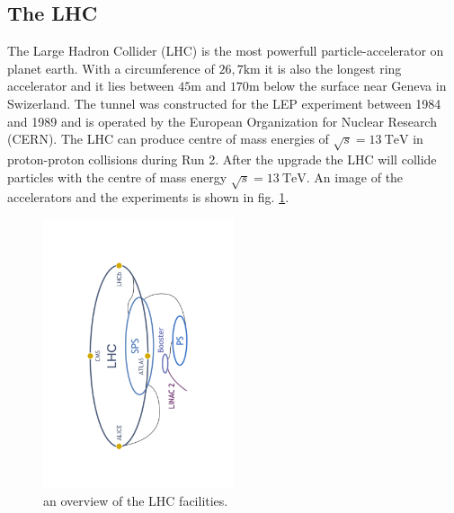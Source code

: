 \subsection{The LHC}
The Large Hadron Collider (LHC)\cite{lhcInfo} is the most powerfull particle-accelerator on planet earth. With a circumference of $26,7\si{\kilo\metre}$ it is also the longest ring accelerator and it lies between $45\si{\metre}$ and $170\si{\metre}$ below the surface near Geneva in Swizerland. The tunnel was constructed for the LEP experiment between 1984 and 1989 and is operated by the European Organization for Nuclear Research (CERN). The LHC can produce centre of mass energies of $\sqrt{s} = \SI{13}{\tera\electronvolt}$ in proton-proton collisions during Run 2. After the upgrade the LHC will collide particles with the centre of mass energy $\sqrt{s} = \SI{13}{\tera\electronvolt}$.
An image of the accelerators and the experiments is shown in fig. \ref{fig:CERN}\cite{facilityCERN}.

\begin{figure}
  \centering
  \includegraphics[angle=-90, origin=c, width=0.5\textwidth]{plots/CERN_layout.pdf}
  \caption{an overview of the LHC facilities.}
  \label{fig:CERN}
\end{figure}

